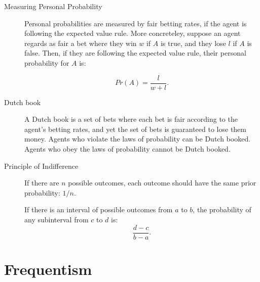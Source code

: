 \documentclass[justified]{tufte-book}
\newcommand{\p}{Pr}
\theoremstyle{definition}
\theoremstyle{definition}
\theoremstyle{definition}
\theoremstyle{remark}
\begin{document}
\begin{description}
\item[Measuring Personal Probability]
Personal probabilities are measured by fair betting rates, if the agent
is following the expected value rule. More concreteley, suppose an agent
regards as fair a bet where they win \(w\) if \(A\) is true, and they
lose \(l\) if \(A\) is false. Then, if they are following the expected
value rule, their personal probability for \(A\) is:

\[ \p(A) = \frac{l}{w + l}. \]
\item[Dutch book]
A Dutch book is a set of bets where each bet is fair according to the
agent's betting rates, and yet the set of bets is guaranteed to lose
them money. Agents who violate the laws of probability can be Dutch
booked. Agents who obey the laws of probability cannot be Dutch booked.
\item[Principle of Indifference]
If there are \(n\) possible outcomes, each outcome should have the same
prior probability: \(1/n\).

If there is an interval of possible outcomes from \(a\) to \(b\), the
probability of any subinterval from \(c\) to \(d\) is:
\[\frac{d-c}{b-a}.\]
\end{description}

\hypertarget{frequentism-1}{%
\section*{Frequentism}\label{frequentism-1}}
\end{document}
